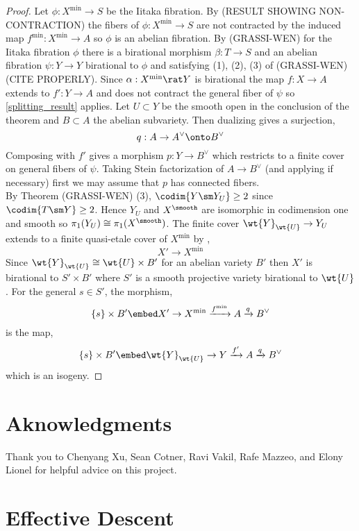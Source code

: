 \documentclass[12pt]{article}
\begin{document}
\begin{proof}
Let $\phi : X^{\min} \to S$ be the Iitaka fibration. By (RESULT SHOWING NON-CONTRACTION) the fibers of $\phi : X^{\min} \to S$ are not contracted by the induced map $f^{\min} : X^{\min} \to A$ so $\phi$ is an abelian fibration. By (GRASSI-WEN) for the Iitaka fibration $\phi$ there is a birational morphism $\beta : T \to S$ and an abelian fibration $\psi : Y \to Y$ birational to $\phi$ and satisfying (1), (2), (3) of (GRASSI-WEN)(CITE PROPERLY). Since $\alpha : X^{\min} \rat Y$ is birational the map $f : X \to A$ extends to $f' : Y \to A$ and does not contract the general fiber of $\psi$ so \ref{splitting_result} applies. Let $U \subset Y$ be the smooth open in the conclusion of the theorem and $B \subset A$ the abelian subvariety. Then dualizing gives a surjection,
\[ q : A \to A^\vee \onto B^\vee \]
Composing with $f'$ gives a morphism $p : Y \to B^\vee$ which restricts to a finite \etale cover on general fibers of $\psi$. Taking Stein factorization of $A \to B^\vee$ (and applying \cite[Theorem 4]{kawamata_abelian_varieties} if necessary) first we may assume that $p$ has connected fibers. 
\bigskip\\
By Theorem (GRASSI-WEN) (3), $\codim{Y \sm Y_U} \ge 2$ since $\codim{T \sm Y} \ge 2$. Hence $Y_U$ and $X^{\smooth}$ are isomorphic in codimension one and smooth so $\pi_1(Y_U) \cong \pi_1(X^{\smooth})$. The finite \etale cover $\wt{Y}_{\wt{U}} \to Y_U$ extends to a finite quasi-etale cover of $X^{\min}$ by \cite[Theorem 3.8]{GKP},
\[ X' \to X^{\min} \]
Since $\wt{Y}_{\wt{U}} \cong \wt{U} \times B'$ for an abelian variety $B'$ then $X'$ is birational to $S' \times B'$ where $S'$ is a smooth projective variety birational to $\wt{U}$. For the general $s \in S'$, the morphism,
\[ \{ s \} \times B' \embed X' \to X^{\min} \xrightarrow{f^{\min}} A \xrightarrow{q} B^\vee \]
is the map,
\[ \{ s \} \times B' \embed \wt{Y}_{\wt{U}} \to Y \xrightarrow{f'} A \xrightarrow{q} B^\vee \]
which is an isogeny. 
\end{proof}

\section{Aknowledgments}

Thank you to Chenyang Xu, Sean Cotner, Ravi Vakil, Rafe Mazzeo, and Elony Lionel for helpful advice on this project. 

\section{Effective Descent}
\end{document}
